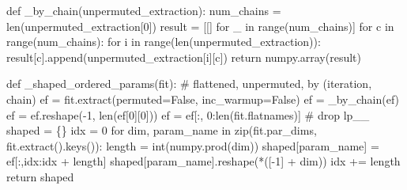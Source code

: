 \documentclass[
  letterpaper,
  DIV=11,
  numbers=noendperiod]{scrartcl}
\newenvironment{Shaded}{\begin{snugshade}}{\end{snugshade}}
\newcommand{\BuiltInTok}[1]{\textcolor[rgb]{0.00,0.23,0.31}{#1}}
\newcommand{\CommentTok}[1]{\textcolor[rgb]{0.37,0.37,0.37}{#1}}
\newcommand{\ControlFlowTok}[1]{\textcolor[rgb]{0.00,0.23,0.31}{#1}}
\newcommand{\DecValTok}[1]{\textcolor[rgb]{0.68,0.00,0.00}{#1}}
\newcommand{\KeywordTok}[1]{\textcolor[rgb]{0.00,0.23,0.31}{#1}}
\newcommand{\NormalTok}[1]{\textcolor[rgb]{0.00,0.23,0.31}{#1}}
\newcommand{\OperatorTok}[1]{\textcolor[rgb]{0.37,0.37,0.37}{#1}}
\newcommand{\VariableTok}[1]{\textcolor[rgb]{0.07,0.07,0.07}{#1}}
\begin{document}
\begin{Shaded}
\begin{Highlighting}[]
\KeywordTok{def}\NormalTok{ \_by\_chain(unpermuted\_extraction):}
\NormalTok{  num\_chains }\OperatorTok{=} \BuiltInTok{len}\NormalTok{(unpermuted\_extraction[}\DecValTok{0}\NormalTok{])}
\NormalTok{  result }\OperatorTok{=}\NormalTok{ [[] }\ControlFlowTok{for}\NormalTok{ \_ }\KeywordTok{in} \BuiltInTok{range}\NormalTok{(num\_chains)]}
  \ControlFlowTok{for}\NormalTok{ c }\KeywordTok{in} \BuiltInTok{range}\NormalTok{(num\_chains):}
    \ControlFlowTok{for}\NormalTok{ i }\KeywordTok{in} \BuiltInTok{range}\NormalTok{(}\BuiltInTok{len}\NormalTok{(unpermuted\_extraction)):}
\NormalTok{      result[c].append(unpermuted\_extraction[i][c])}
  \ControlFlowTok{return}\NormalTok{ numpy.array(result)}

\KeywordTok{def}\NormalTok{ \_shaped\_ordered\_params(fit):}
  \CommentTok{\# flattened, unpermuted, by (iteration, chain)}
\NormalTok{  ef }\OperatorTok{=}\NormalTok{ fit.extract(permuted}\OperatorTok{=}\VariableTok{False}\NormalTok{, inc\_warmup}\OperatorTok{=}\VariableTok{False}\NormalTok{)}
\NormalTok{  ef }\OperatorTok{=}\NormalTok{ \_by\_chain(ef)}
\NormalTok{  ef }\OperatorTok{=}\NormalTok{ ef.reshape(}\OperatorTok{{-}}\DecValTok{1}\NormalTok{, }\BuiltInTok{len}\NormalTok{(ef[}\DecValTok{0}\NormalTok{][}\DecValTok{0}\NormalTok{]))}
\NormalTok{  ef }\OperatorTok{=}\NormalTok{ ef[:, }\DecValTok{0}\NormalTok{:}\BuiltInTok{len}\NormalTok{(fit.flatnames)] }\CommentTok{\# drop lp\_\_}
\NormalTok{  shaped }\OperatorTok{=}\NormalTok{ \{\}}
\NormalTok{  idx }\OperatorTok{=} \DecValTok{0}
  \ControlFlowTok{for}\NormalTok{ dim, param\_name }\KeywordTok{in} \BuiltInTok{zip}\NormalTok{(fit.par\_dims, fit.extract().keys()):}
\NormalTok{    length }\OperatorTok{=} \BuiltInTok{int}\NormalTok{(numpy.prod(dim))}
\NormalTok{    shaped[param\_name] }\OperatorTok{=}\NormalTok{ ef[:,idx:idx }\OperatorTok{+}\NormalTok{ length]}
\NormalTok{    shaped[param\_name].reshape(}\OperatorTok{*}\NormalTok{([}\OperatorTok{{-}}\DecValTok{1}\NormalTok{] }\OperatorTok{+}\NormalTok{ dim))}
\NormalTok{    idx }\OperatorTok{+=}\NormalTok{ length}
  \ControlFlowTok{return}\NormalTok{ shaped}


\end{Highlighting}
\end{Shaded}
\end{document}
